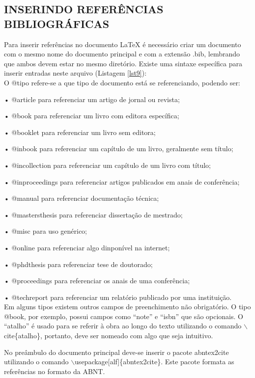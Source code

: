 \subsection{INSERINDO REFERÊNCIAS BIBLIOGRÁFICAS}
Para inserir referências no documento LaTeX é necessário criar um documento com o mesmo nome do documento principal e com a extensão .bib, lembrando que ambos devem estar no mesmo diretório. Existe uma sintaxe específica para inserir entradas neste arquivo (Listagem \ref{lst9}):\\



O @tipo refere-se a que tipo de documento está se referenciando, podendo ser:

•	@article para referenciar um artigo de jornal ou revista;

•	@book para referenciar um livro com editora específica;

•	@booklet para referenciar um livro sem editora;

•	@inbook para referenciar um capítulo de um livro, geralmente sem título;

•	@incollection para referenciar um capítulo de um livro com título;

•	@inproceedings para referenciar artigos publicados em anais de conferência;

•	@manual para referenciar documentação técnica;

•	@mastersthesis para referenciar dissertação de mestrado;

•	@misc para uso genérico;

•	@online para referenciar algo dinponível na internet;

•	@phdthesis para referenciar tese de doutorado;

•	@proceedings para referenciar os anais de uma conferência;

•	@techreport para referenciar um relatório publicado por uma instituição.\\

Em alguns tipos existem outros campos de preenchimento não obrigatório. O tipo @book, por exemplo, possui campos como “note” e “isbn” que são opcionais. O “atalho” é usado para se referir à obra ao longo do texto utilizando o comando $\backslash$cite\{atalho\}, portanto, deve ser nomeado com algo que seja intuitivo.

No preâmbulo do documento principal deve-se inserir o pacote abntex2cite utilizando o comando $\backslash$usepackage[alf]\{abntex2cite\}. Este pacote formata as referências no formato da ABNT.

